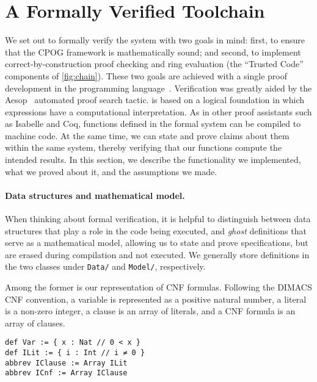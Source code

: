 
\section{A Formally Verified Toolchain}
\label{sect:formally-verified-toolchain}
\label{sect:lean:subtle-condition}

We set out to formally verify the system with two goals in mind:
first, to ensure that the CPOG framework is mathematically sound;
and second, to implement correct-by-construction proof checking
and ring evaluation (the ``Trusted Code'' components of \ref{fig:chain}).
These two goals are achieved with a single proof development
in the \lean{} programming language~\cite{demoura:cade:2021}.
Verification was greatly aided
by the Aesop~\cite{23limperg_aesop_white_box_best_first_proof_search_lean}
automated proof search tactic.
\lean{} is based on a logical foundation
in which expressions have a computational interpretation.
As in other proof assistants such as Isabelle and Coq,
functions defined in the formal system
can be compiled to machine code.
At the same time,
we can state and prove claims about them within the same system,
thereby verifying that our functions compute the intended results.
In this section,
we describe the functionality we implemented,
what we proved about it,
and the assumptions we made.

\paragraph{Data structures and mathematical model.}
When thinking about formal verification,
it is helpful to distinguish between data structures
that play a role in the code being executed,
and \emph{ghost} definitions that serve as a mathematical model,
allowing us to state and prove specifications,
but are erased during compilation and not executed.
We generally store definitions in the two classes
under {\tt Data/} and {\tt Model/},
respectively.

Among the former is our representation of CNF formulas.
Following the DIMACS CNF convention,
a variable is represented as a positive natural number,
a literal is a non-zero integer,
a clause is an array of literals,
and a CNF formula is an array of clauses.
\begin{lstlisting}
def Var := { x : Nat // 0 < x }
def ILit := { i : Int // i ≠ 0 }
abbrev IClause := Array ILit
abbrev ICnf := Array IClause
\end{lstlisting}

